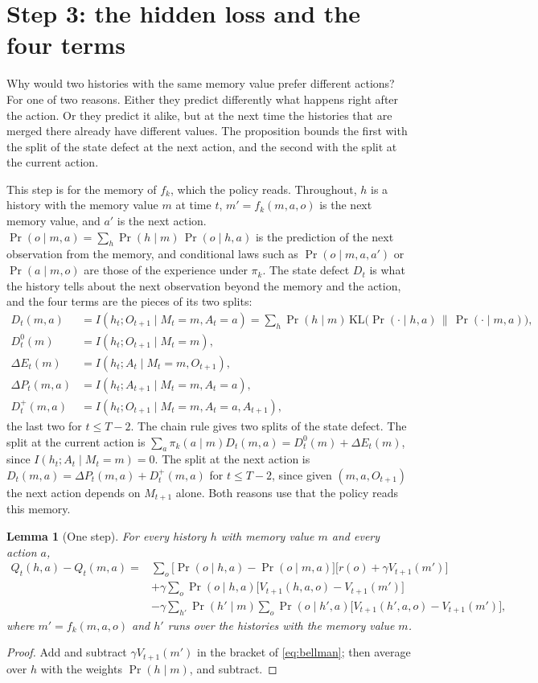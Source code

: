 \documentclass[11pt]{article}
\newtheorem{lemma}{Lemma}
\theoremstyle{definition}
\newcommand{\KL}{\mathrm{KL}}
\newcommand{\dE}{\Delta E}
\newcommand{\dP}{\Delta P}
\begin{document}
\section{Step 3: the hidden loss and the four terms}

Why would two histories with the same memory value prefer different actions? For one of two reasons. Either they predict differently what happens right after the action. Or they predict it alike, but at the next time the histories that are merged there already have different values. The proposition bounds the first with the split of the state defect at the next action, and the second with the split at the current action.

This step is for the memory of $f_k$, which the policy reads. Throughout, $h$ is a history with the memory value $m$ at time $t$, $m'=f_k(m,a,o)$ is the next memory value, and $a'$ is the next action. $\Pr(o\mid m,a)=\sum_h\Pr(h\mid m)\,\Pr(o\mid h,a)$ is the prediction of the next observation from the memory, and conditional laws such as $\Pr(o\mid m,a,a')$ or $\Pr(a\mid m,o)$ are those of the experience under $\pi_k$. The state defect $D_t$ is what the history tells about the next observation beyond the memory and the action, and the four terms are the pieces of its two splits:
\begin{align*}
D_t(m,a)&=I(h_t;O_{t+1}\mid M_t=m,A_t=a)=\sum_h\Pr(h\mid m)\,\KL\big(\Pr(\cdot\mid h,a)\,\big\|\,\Pr(\cdot\mid m,a)\big),\\
D^0_t(m)&=I(h_t;O_{t+1}\mid M_t=m),\\
\dE_t(m)&=I(h_t;A_t\mid M_t=m,O_{t+1}),\\
\dP_t(m,a)&=I(h_t;A_{t+1}\mid M_t=m,A_t=a),\\
D^+_t(m,a)&=I(h_t;O_{t+1}\mid M_t=m,A_t=a,A_{t+1}),
\end{align*}
the last two for $t\le T-2$. The chain rule gives two splits of the state defect. The split at the current action is $\sum_a\pi_k(a\mid m)D_t(m,a)=D^0_t(m)+\dE_t(m)$, since $I(h_t;A_t\mid M_t=m)=0$. The split at the next action is $D_t(m,a)=\dP_t(m,a)+D^+_t(m,a)$ for $t\le T-2$, since given $(m,a,O_{t+1})$ the next action depends on $M_{t+1}$ alone. Both reasons use that the policy reads this memory.

\begin{lemma}[One step]\label{lem:onestep}
For every history $h$ with memory value $m$ and every action $a$,
\begin{align}
Q_t(h,a)-Q_t(m,a)={}&\sum_o\big[\Pr(o\mid h,a)-\Pr(o\mid m,a)\big]\big[r(o)+\gamma V_{t+1}(m')\big] \label{eq:now}\\
&+\gamma\sum_o\Pr(o\mid h,a)\big[V_{t+1}(h,a,o)-V_{t+1}(m')\big] \label{eq:carried}\\
&-\gamma\sum_{h'}\Pr(h'\mid m)\sum_o\Pr(o\mid h',a)\big[V_{t+1}(h',a,o)-V_{t+1}(m')\big], \nonumber
\end{align}
where $m'=f_k(m,a,o)$ and $h'$ runs over the histories with the memory value $m$.
\end{lemma}
\begin{proof}
Add and subtract $\gamma V_{t+1}(m')$ in the bracket of \eqref{eq:bellman}; then average over $h$ with the weights $\Pr(h\mid m)$, and subtract.
\end{proof}
\end{document}
